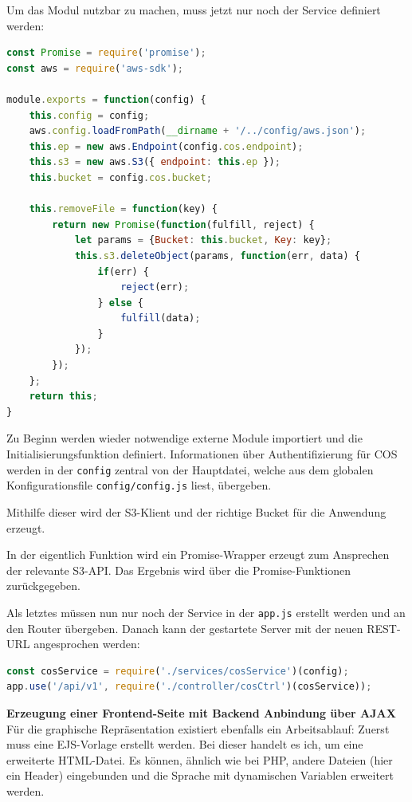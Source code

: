 Um das Modul nutzbar zu machen, muss jetzt nur noch der Service definiert werden:\\

\begin{lstlisting}[language=JavaScript, caption=CosService.js für die Kommunikation mit IBM COS]
const Promise = require('promise');
const aws = require('aws-sdk');

module.exports = function(config) {
	this.config = config;
	aws.config.loadFromPath(__dirname + '/../config/aws.json');
	this.ep = new aws.Endpoint(config.cos.endpoint);
	this.s3 = new aws.S3({ endpoint: this.ep });
	this.bucket = config.cos.bucket;
	
	this.removeFile = function(key) {
		return new Promise(function(fulfill, reject) {
			let params = {Bucket: this.bucket, Key: key};
			this.s3.deleteObject(params, function(err, data) {
				if(err) {
					reject(err);
				} else {
					fulfill(data);
				}
			});
		});
	};
	return this;
}
\end{lstlisting}

Zu Beginn werden wieder notwendige externe Module importiert und die Initialisierungsfunktion definiert. Informationen über Authentifizierung für \ac{COS} werden in der \lstinline|config| zentral von der Hauptdatei, welche aus dem globalen Konfigurationsfile \lstinline|config/config.js| liest, übergeben.

Mithilfe dieser wird der \ac{S3}-Klient und der richtige Bucket für die Anwendung erzeugt. 

In der eigentlich Funktion wird ein Promise-Wrapper erzeugt zum Ansprechen der relevante S3-API. Das Ergebnis wird über die Promise-Funktionen zurückgegeben.

Als letztes müssen nun nur noch der Service in der \lstinline|app.js| erstellt werden und an den Router übergeben. Danach kann der gestartete Server mit der neuen REST-URL angesprochen werden:\\

\begin{lstlisting}[language=JavaScript, caption=Einbindung der neuen Route in der app.js]
const cosService = require('./services/cosService')(config);
app.use('/api/v1', require('./controller/cosCtrl')(cosService));
\end{lstlisting}

\textbf{Erzeugung einer Frontend-Seite mit Backend Anbindung über AJAX}\\
Für die graphische Repräsentation existiert ebenfalls ein Arbeitsablauf: Zuerst muss eine EJS-Vorlage erstellt werden. Bei dieser handelt es ich, um eine erweiterte HTML-Datei. Es können, ähnlich wie bei PHP, andere Dateien (hier ein Header) eingebunden und die Sprache mit dynamischen Variablen erweitert werden.


